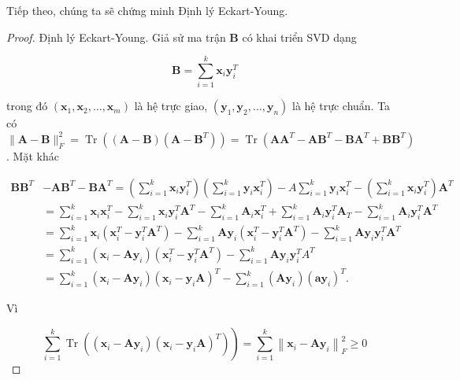 \documentclass[14pt,oneside,a4paper]{report}
\numberwithin{equation}{section}
\begin{document}
Tiếp theo, chúng ta sẽ chứng minh Định lý Eckart-Young.
\begin{proof}
Định lý Eckart-Young. Giả sử ma trận $\mathbf{B}$ có khai triển SVD dạng

$$
\mathbf{B}=\sum_{i=1}^{k} \mathbf{x}_{i} \mathbf{y}_{i}^{T}
$$

trong đó $\left(\mathbf{x}_{1}, \mathbf{x}_{2}, \ldots, \mathbf{x}_{m}\right)$ là hệ trực giao, $\left(\mathbf{y}_{1}, \mathbf{y}_{2}, \ldots, \mathbf{y}_{n}\right)$ là hệ trực chuẩn. Ta có $\|\mathbf{A}-\mathbf{B}\|_{F}^{2}=\operatorname{Tr}\left((\mathbf{A}-\mathbf{B})\left(\mathbf{A}-\mathbf{B}^{T}\right)\right)=\operatorname{Tr}\left(\mathbf{A} \mathbf{A}^{T}-\mathbf{A} \mathbf{B}^{T}-\mathbf{B A}^{T}+\mathbf{B B}^{T}\right)$. Mặt khác

$$
\begin{aligned}
	\mathbf{B} \mathbf{B}^{T} & -\mathbf{A B}^{T}-\mathbf{B} \mathbf{A}^{T}=\left(\sum_{i=1}^{k} \mathbf{x}_{i} \mathbf{y}_{i}^{T}\right)\left(\sum_{i=1}^{k} \mathbf{y}_{i} \mathbf{x}_{i}^{T}\right)-A \sum_{i=1}^{k} \mathbf{y}_{i} \mathbf{x}_{i}^{T}-\left(\sum_{i=1}^{k} \mathbf{x}_{i} \mathbf{y}_{i}^{T}\right) \mathbf{A}^{T} \\
	& =\sum_{i=1}^{k} \mathbf{x}_{i} \mathbf{x}_{i}^{T}-\sum_{i=1}^{k} \mathbf{x}_{i} \mathbf{y}_{i}^{T} \mathbf{A}^{T}-\sum_{i=1}^{k} \mathbf{A}_{i} \mathbf{x}_{i}^{T}+\sum_{i=1}^{k} \mathbf{A}_{i} \mathbf{y}_{i}^{T} \mathbf{A}_{T}-\sum_{i=1}^{k} \mathbf{A}_{i} \mathbf{y}_{i}^{T} \mathbf{A}^{T} \\
	& =\sum_{i=1}^{k} \mathbf{x}_{i}\left(\mathbf{x}_{i}^{T}-\mathbf{y}_{i}^{T} \mathbf{A}^{T}\right)-\sum_{i=1}^{k} \mathbf{A} \mathbf{y}_{i}\left(\mathbf{x}_{i}^{T}-\mathbf{y}_{i}^{T} \mathbf{A}^{T}\right)-\sum_{i=1}^{k} \mathbf{A} \mathbf{y}_{i} \mathbf{y}_{i}^{T} \mathbf{A}^{T} \\
	& =\sum_{i=1}^{k}\left(\mathbf{x}_{i}-\mathbf{A} \mathbf{y}_{i}\right)\left(\mathbf{x}_{i}^{T}-\mathbf{y}_{i}^{T} \mathbf{A}^{T}\right)-\sum_{i=1}^{k} \mathbf{A} \mathbf{y}_{i} \mathbf{y}_{i}^{T} A^{T} \\
	& =\sum_{i=1}^{k}\left(\mathbf{x}_{i}-\mathbf{A} \mathbf{y}_{i}\right)\left(\mathbf{x}_{i}-\mathbf{y}_{i} \mathbf{A}\right)^{T}-\sum_{i=1}^{k}\left(\mathbf{A y}_{i}\right)\left(\mathbf{a y}_{i}\right)^{T} .
\end{aligned}
$$

Vì

$$
\left.\sum_{i=1}^{k} \operatorname{Tr}\left(\left(\mathbf{x}_{i}-\mathbf{A y}_{i}\right)\left(\mathbf{x}_{i}-\mathbf{y}_{i} \mathbf{A}\right)^{T}\right)\right)=\sum_{i=1}^{k}\left\|\mathbf{x}_{i}-\mathbf{A y}_{i}\right\|_{F}^{2} \geqslant 0
$$


\end{proof}
\end{document}
